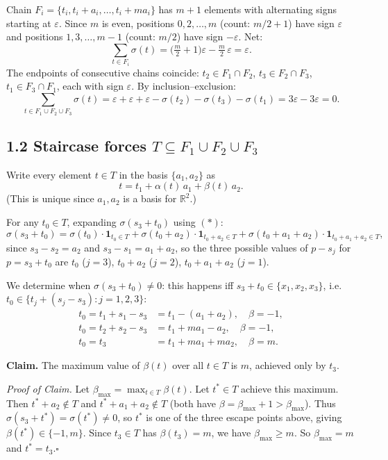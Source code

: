 Chain \(F_i=\{t_i,t_i+a_i,\dots,t_i+ma_i\}\) has \(m+1\) elements with alternating signs starting at \(\varepsilon\).  Since \(m\) is even, positions \(0,2,\dots,m\) (count: \(m/2+1\)) have sign \(\varepsilon\) and positions \(1,3,\dots,m-1\) (count: \(m/2\)) have sign \(-\varepsilon\).  Net:
\[
  \sum_{t\in F_i}\sigma(t) = \bigl(\tfrac m2+1\bigr)\varepsilon - \tfrac m2\,\varepsilon = \varepsilon.
\]
The endpoints of consecutive chains coincide: \(t_2\in F_1\cap F_2\), \(t_3\in F_2\cap F_3\), \(t_1\in F_3\cap F_1\), each with sign \(\varepsilon\).  By inclusion--exclusion:
\[
  \sum_{t\in F_1\cup F_2\cup F_3}\!\sigma(t)
  = \varepsilon+\varepsilon+\varepsilon - \sigma(t_2)-\sigma(t_3)-\sigma(t_1)
  = 3\varepsilon - 3\varepsilon = 0.
\]

\subsection*{1.2 Staircase forces $T\subseteq F_1\cup F_2\cup F_3$}

Write every element \(t\in T\) in the basis \(\{a_1,a_2\}\) as
\[
  t = t_1 + \alpha(t)\,a_1 + \beta(t)\,a_2.
\]
(This is unique since \(a_1,a_2\) is a basis for \(\mathbb{R}^2\).)

For any \(t_0\in T\), expanding \(\sigma(s_3+t_0)\) using $(\ast)$:
\[
  \sigma(s_3+t_0)
  = \sigma(t_0)\cdot\mathbf{1}_{t_0\in T}
  + \sigma(t_0+a_2)\cdot\mathbf{1}_{t_0+a_2\in T}
  + \sigma(t_0+a_1+a_2)\cdot\mathbf{1}_{t_0+a_1+a_2\in T},
\]
since \(s_3-s_2=a_2\) and \(s_3-s_1=a_1+a_2\), so the three possible values of \(p-s_j\) for \(p=s_3+t_0\) are \(t_0\) (\(j=3\)), \(t_0+a_2\) (\(j=2\)), \(t_0+a_1+a_2\) (\(j=1\)).

We determine when \(\sigma(s_3+t_0)\ne 0\): this happens iff \(s_3+t_0\in\{x_1,x_2,x_3\}\), i.e.\ \(t_0\in\{t_j+(s_j-s_3):j=1,2,3\}\):
\begin{align*}
  t_0 = t_1+s_1-s_3 &= t_1-(a_1+a_2),\quad\beta = -1,\\
  t_0 = t_2+s_2-s_3 &= t_1+ma_1-a_2,\quad\beta = -1,\\
  t_0 = t_3 &= t_1+ma_1+ma_2,\quad\beta = m.
\end{align*}

\medskip\noindent
\textbf{Claim.}  The maximum value of \(\beta(t)\) over all \(t\in T\) is \(m\), achieved only by \(t_3\).

\smallskip\noindent\textit{Proof of Claim.}
Let \(\beta_{\max}=\max_{t\in T}\beta(t)\).  Let \(t^*\in T\) achieve this maximum.  Then \(t^*+a_2\notin T\) and \(t^*+a_1+a_2\notin T\) (both have \(\beta=\beta_{\max}+1>\beta_{\max}\)).  Thus \(\sigma(s_3+t^*)=\sigma(t^*)\ne 0\), so \(t^*\) is one of the three escape points above, giving \(\beta(t^*)\in\{-1,m\}\).  Since \(t_3\in T\) has \(\beta(t_3)=m\), we have \(\beta_{\max}\ge m\).  So \(\beta_{\max}=m\) and \(t^*=t_3\).\hfill\(\square\)

